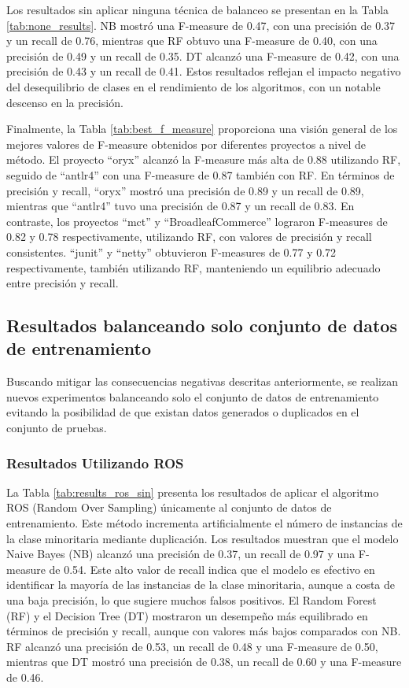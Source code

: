 Los resultados sin aplicar ninguna técnica de balanceo se presentan en la Tabla \ref{tab:none_results}. NB mostró una F-measure de 0.47, con una precisión de 0.37 y un recall de 0.76, mientras que RF obtuvo una F-measure de 0.40, con una precisión de 0.49 y un recall de 0.35. DT alcanzó una F-measure de 0.42, con una precisión de 0.43 y un recall de 0.41. Estos resultados reflejan el impacto negativo del desequilibrio de clases en el rendimiento de los algoritmos, con un notable descenso en la precisión.



Finalmente, la Tabla \ref{tab:best_f_measure} proporciona una visión general de los mejores valores de F-measure obtenidos por diferentes proyectos a nivel de método. El proyecto ``oryx'' alcanzó la F-measure más alta de 0.88 utilizando RF, seguido de ``antlr4'' con una F-measure de 0.87 también con RF. En términos de precisión y recall, ``oryx'' mostró una precisión de 0.89 y un recall de 0.89, mientras que ``antlr4'' tuvo una precisión de 0.87 y un recall de 0.83. En contraste, los proyectos ``mct'' y ``BroadleafCommerce'' lograron F-measures de 0.82 y 0.78 respectivamente, utilizando RF, con valores de precisión y recall consistentes. ``junit'' y ``netty'' obtuvieron F-measures de 0.77 y 0.72 respectivamente, también utilizando RF, manteniendo un equilibrio adecuado entre precisión y recall.



\subsection{Resultados balanceando solo conjunto de datos de entrenamiento}

Buscando mitigar las consecuencias negativas descritas anteriormente, se realizan nuevos experimentos balanceando solo el conjunto de datos de entrenamiento evitando la posibilidad de que existan datos generados o duplicados en el conjunto de pruebas.

\subsubsection{Resultados Utilizando ROS}
La Tabla \ref{tab:results_ros_sin} presenta los resultados de aplicar el algoritmo ROS (Random Over Sampling) únicamente al conjunto de datos de entrenamiento. Este método incrementa artificialmente el número de instancias de la clase minoritaria mediante duplicación. Los resultados muestran que el modelo Naive Bayes (NB) alcanzó una precisión de 0.37, un recall de 0.97 y una F-measure de 0.54. Este alto valor de recall indica que el modelo es efectivo en identificar la mayoría de las instancias de la clase minoritaria, aunque a costa de una baja precisión, lo que sugiere muchos falsos positivos. El Random Forest (RF) y el Decision Tree (DT) mostraron un desempeño más equilibrado en términos de precisión y recall, aunque con valores más bajos comparados con NB. RF alcanzó una precisión de 0.53, un recall de 0.48 y una F-measure de 0.50, mientras que DT mostró una precisión de 0.38, un recall de 0.60 y una F-measure de 0.46.


